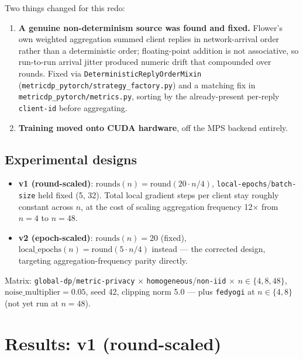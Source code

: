 \documentclass[11pt]{article}
\newcommand{\code}[1]{\texttt{#1}}
\begin{document}
Two things changed for this redo:
\begin{enumerate}[leftmargin=1.4em]
    \item \textbf{A genuine non-determinism source was found and fixed.} Flower's own weighted
    aggregation summed client replies in network-arrival order rather than a deterministic order;
    floating-point addition is not associative, so run-to-run arrival jitter produced numeric drift
    that compounded over rounds. Fixed via \code{DeterministicReplyOrderMixin}
    (\code{metricdp\_pytorch/strategy\_factory.py}) and a matching fix in \code{metricdp\_pytorch/metrics.py},
    sorting by the already-present per-reply \code{client-id} before aggregating.
    \item \textbf{Training moved onto CUDA hardware}, off the MPS backend entirely.
\end{enumerate}

\subsection*{Experimental designs}
\begin{itemize}[leftmargin=1.4em]
    \item \textbf{v1 (round-scaled)}: $\text{rounds}(n) = \text{round}(20 \cdot n / 4)$,
    \code{local-epochs}/\code{batch-size} held fixed (5, 32). Total local gradient steps per client
    stay roughly constant across $n$, at the cost of scaling aggregation frequency 12$\times$ from
    $n{=}4$ to $n{=}48$.
    \item \textbf{v2 (epoch-scaled)}: $\text{rounds}(n) = 20$ (fixed),
    $\text{local\_epochs}(n) = \text{round}(5 \cdot n / 4)$ instead --- the corrected design,
    targeting aggregation-frequency parity directly.
\end{itemize}
Matrix: \code{global-dp}/\code{metric-privacy} $\times$ \code{homogeneous}/\code{non-iid} $\times$
$n \in \{4,8,48\}$, $\text{noise\_multiplier}=0.05$, seed 42, clipping norm 5.0 --- plus
\code{fedyogi} at $n \in \{4,8\}$ (not yet run at $n{=}48$).

\section{Results: v1 (round-scaled)}
\label{sec:v1}
\end{document}

